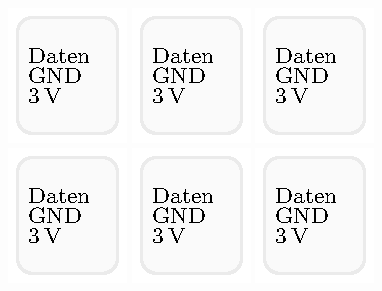 \documentclass[12pt, a4paper, twoside, openright]{report}
\begin{document}
\begin{figure}[h]
		\includegraphics[scale=1]{aufkl_phototransistor}
		\includegraphics[scale=1]{aufkl_phototransistor}
		\includegraphics[scale=1]{aufkl_phototransistor}
		\includegraphics[scale=1]{aufkl_phototransistor}
		\includegraphics[scale=1]{aufkl_phototransistor}		
		\includegraphics[scale=1]{aufkl_phototransistor}
\end{figure}
\end{document}
